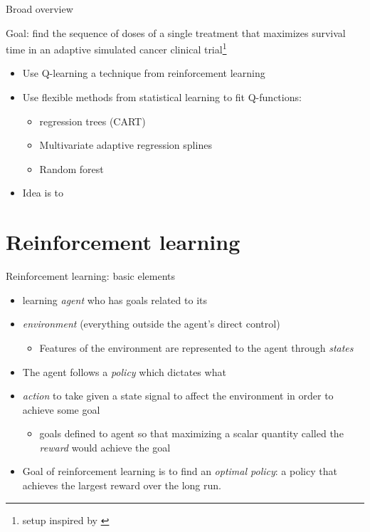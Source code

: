 \documentclass[10pt]{beamer}
\begin{document}
\begin{frame}[c]{Broad overview}

Goal: find the sequence of doses of a single treatment that maximizes survival time in an adaptive simulated cancer clinical trial\footnote{setup inspired by \textcite{crt}} 
\begin{itemize}
    \item Use Q-learning a technique from reinforcement learning
    \item Use flexible methods from statistical learning to fit Q-functions: 
    \begin{itemize}
      \item regression trees (CART)
      \item Multivariate adaptive regression splines
      \item Random forest
    \end{itemize}
    \item Idea is to  
\end{itemize}

\end{frame}

\section{Reinforcement learning} %
\label{sec:reinforcement_learning}

\begin{frame}[c]{Reinforcement learning: basic elements}

\begin{itemize}[<+->]
  \item learning \emph{agent} who has goals related to its
  \item \emph{environment} (everything outside the agent's direct control)
  \begin{itemize}
    \item Features of the environment are represented to the agent through \emph{states}
  \end{itemize}
  \item The agent follows a \emph{policy} which dictates what 
  \item \emph{action} to take given a state signal to affect the environment in order to achieve some goal
  \begin{itemize}
    \item goals defined to agent so that maximizing a scalar quantity called the \emph{reward} would achieve the goal
  \end{itemize}
  \item Goal of reinforcement learning is to find an \emph{optimal policy}: a policy that achieves the largest reward over the long run. 
\end{itemize}

\end{frame}
\end{document}
